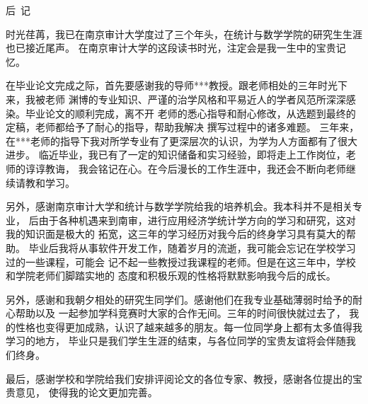 \centerline{\large\heiti 后\ 记}

\vspace{2ex}

时光荏苒，我已在南京审计大学度过了三个年头，在统计与数学学院的研究生生涯也已接近尾声。
在南京审计大学的这段读书时光，注定会是我一生中的宝贵记忆。

在毕业论文完成之际，首先要感谢我的导师***教授。跟老师相处的三年时光下来，我被老师
渊博的专业知识、严谨的治学风格和平易近人的学者风范所深深感染。毕业论文的顺利完成，离不开
老师的悉心指导和耐心修改，从选题到最终的定稿，老师都给予了耐心的指导，帮助我解决
撰写过程中的诸多难题。
三年来，在***老师的指导下我对所学专业有了更深层次的认识，为学为人方面都有了很大进步。
临近毕业，我已有了一定的知识储备和实习经验，即将走上工作岗位，老师的谆谆教诲，
我会铭记在心。在今后漫长的工作生涯中，我还会不断向老师继续请教和学习。

另外，感谢南京审计大学和统计与数学学院给我的培养机会。我本科并不是相关专业，
后由于各种机遇来到南审，进行应用经济学统计学方向的学习和研究，这对我的知识面是极大的
拓宽，这三年的学习经历对我今后的终身学习具有莫大的帮助。
毕业后我将从事软件开发工作，随着岁月的流逝，我可能会忘记在学校学习过的一些课程，可能会
记不起一些教授过我课程的老师。但是在这三年中，学校和学院老师们脚踏实地的
态度和积极乐观的性格将默默影响我今后的成长。

另外，感谢和我朝夕相处的研究生同学们。感谢他们在我专业基础薄弱时给予的耐心帮助以及
一起参加学科竞赛时大家的合作无间。三年的时间很快就过去了，
我的性格也变得更加成熟，认识了越来越多的朋友。每一位同学身上都有太多值得我学习的地方，
毕业只是我们学生生涯的结束，与各位同学的宝贵友谊将会伴随我们终身。

最后，感谢学校和学院给我们安排评阅论文的各位专家、教授，感谢各位提出的宝贵意见，
使得我的论文更加完善。
\vspace{2ex}

\thispagestyle{plain}

\rightline{ ***\ \ \ \ \ }
\vspace{1ex}
